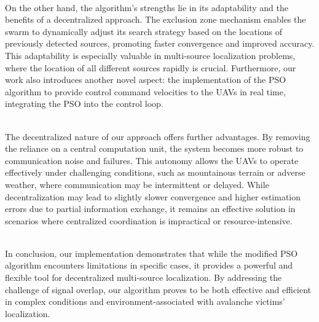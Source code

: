 \documentclass[main]{subfiles}
\begin{document}
\noindent\\
On the other hand, the algorithm's strengths lie in its adaptability and
the benefits of a decentralized approach. The exclusion zone mechanism
enables the swarm to dynamically adjust its search strategy based on the
locations of previously detected sources, promoting faster convergence
and improved accuracy. This adaptability is especially valuable in
multi-source localization problems, where the location of all different
sources rapidly is crucial.
Furthermore, our work also introduces another novel aspect: 
the implementation of the PSO algorithm to provide control command velocities 
to the UAVs in real time, integrating the PSO into the control
loop.

\noindent\\
The decentralized nature of our approach offers further advantages. By
removing the reliance on a central computation unit, the system becomes
more robust to communication noise and failures. This autonomy allows
the UAVs to operate effectively under challenging conditions, such as
mountainous terrain or adverse weather, where communication may be
intermittent or delayed. While decentralization may lead to slightly
slower convergence and higher estimation errors due to partial
information exchange, it remains an effective solution in scenarios
where centralized coordination is impractical or resource-intensive.

\noindent\\
In conclusion, our implementation demonstrates that while the modified PSO
algorithm encounters limitations in specific cases, it provides a
powerful and flexible tool for decentralized multi-source localization.
By addressing the challenge of signal overlap, our algorithm proves to be
both effective and efficient in complex conditions and environment-associated
with avalanche victims' localization.
\end{document}
